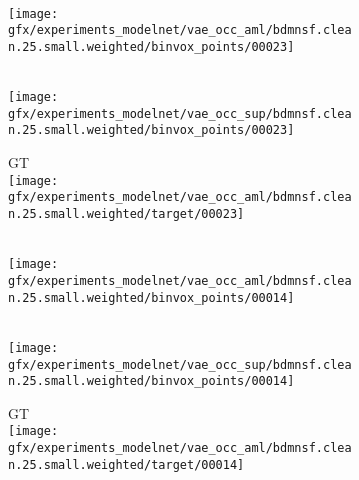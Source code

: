 \begin{figure}[t!]
    \centering
    \vspace*{-0.25cm}
    \begin{subfigure}[t]{0.075\textwidth}
        \vspace{0px}
        \centering
        \small\AML\\[4px]
        \texttt{[image: gfx/experiments\_modelnet/vae\_occ\_aml/bdmnsf.clean.25.small.weighted/binvox\_points/00023]}
    \end{subfigure}
    \begin{subfigure}[t]{0.075\textwidth}
        \vspace{0px}
        \centering
        \small\Sup\\[4px]
        \texttt{[image: gfx/experiments\_modelnet/vae\_occ\_sup/bdmnsf.clean.25.small.weighted/binvox\_points/00023]}
    \end{subfigure}
    \begin{subfigure}[t]{0.075\textwidth}
        \vspace{0px}
        \centering
        \small GT\\[4px]
        \texttt{[image: gfx/experiments\_modelnet/vae\_occ\_aml/bdmnsf.clean.25.small.weighted/target/00023]}
    \end{subfigure}
    \begin{subfigure}[t]{0.075\textwidth}
        \vspace{0px}
        \centering
        \small\AML\\[4px]
        \texttt{[image: gfx/experiments\_modelnet/vae\_occ\_aml/bdmnsf.clean.25.small.weighted/binvox\_points/00014]}
    \end{subfigure}
    \begin{subfigure}[t]{0.075\textwidth}
        \vspace{0px}
        \centering
        \small\Sup\\[4px]
        \texttt{[image: gfx/experiments\_modelnet/vae\_occ\_sup/bdmnsf.clean.25.small.weighted/binvox\_points/00014]}
    \end{subfigure}
    \begin{subfigure}[t]{0.075\textwidth}
        \vspace{0px}
        \centering
        \small GT\\[4px]
        \texttt{[image: gfx/experiments\_modelnet/vae\_occ\_aml/bdmnsf.clean.25.small.weighted/target/00014]}

\end{subfigure}
\end{figure}
